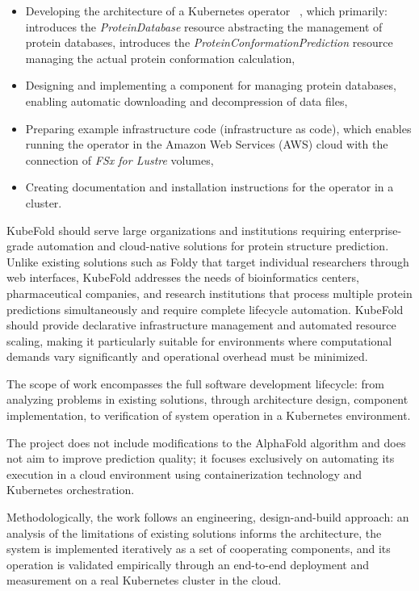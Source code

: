 \begin{itemize}
    \item Developing the architecture of a Kubernetes operator ~\cite{k8s_operators}, which primarily:
    \subitem introduces the \textit{ProteinDatabase} resource abstracting the management of protein databases,
    \subitem introduces the \textit{ProteinConformationPrediction} resource managing the actual protein conformation calculation,
    \item Designing and implementing a component for managing protein databases, enabling automatic downloading and decompression of data files,
    \item Preparing example infrastructure code (infrastructure as code), which enables running the operator in the Amazon Web Services (AWS) cloud with the connection of \textit{FSx for Lustre} volumes,
    \item Creating documentation and installation instructions for the operator in a cluster.
\end{itemize}

KubeFold should serve large organizations and institutions requiring enterprise-grade automation and cloud-native solutions for protein structure prediction. Unlike existing solutions such as Foldy that target individual researchers through web interfaces, KubeFold addresses the needs of bioinformatics centers, pharmaceutical companies, and research institutions that process multiple protein predictions simultaneously and require complete lifecycle automation. KubeFold should provide declarative infrastructure management and automated resource scaling, making it particularly suitable for environments where computational demands vary significantly and operational overhead must be minimized.

The scope of work encompasses the full software development lifecycle: from analyzing problems in existing solutions, through architecture design, component implementation, to verification of system operation in a Kubernetes environment.

The project does not include modifications to the AlphaFold algorithm and does not aim to improve prediction quality; it focuses exclusively on automating its execution in a cloud environment using containerization technology and Kubernetes orchestration.

Methodologically, the work follows an engineering, design-and-build approach: an analysis of the limitations of existing solutions informs the architecture, the system is implemented iteratively as a set of cooperating components, and its operation is validated empirically through an end-to-end deployment and measurement on a real Kubernetes cluster in the cloud.

